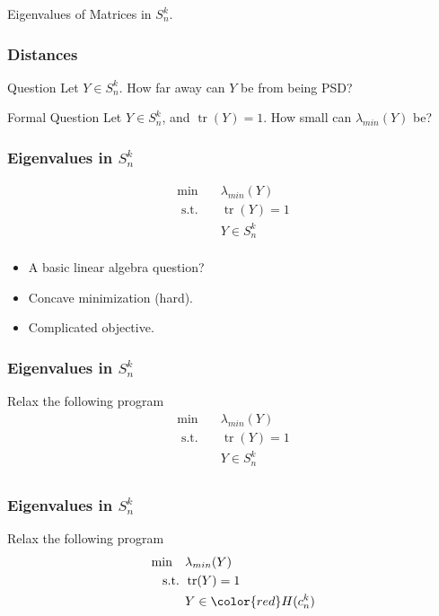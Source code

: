 \documentclass{beamer}
\DeclareMathOperator{\tr}{tr}
\newcommand{\st}{{\text{ s.t. }}}
\begin{document}
\begin{frame}
    \centering
    \huge
    {\color{gray}Eigenvalues of Matrices in $S^k_n$.}
\end{frame}
\begin{frame}
    \frametitle{Distances}
    \begin{block}{Question}
        Let $Y \in S^k_n$. How far away can $Y$ be from being PSD?
    \end{block}
    \pause
    \begin{block}{Formal Question}
        Let $Y \in S^k_n$, and $\tr(Y)=1$. How small can $\lambda_{min}(Y)$ be?
    \end{block}
\end{frame}
\begin{frame}
    \frametitle{Eigenvalues in $S^k_n$}
    \begin{equation*}
        \begin{aligned}
            \min\quad & \lambda_{min}(Y)\\
            \st & \tr(Y) = 1\\
                & Y \in S^k_n\\
        \end{aligned}
    \end{equation*}
    \pause
    \begin{itemize}
        \item A basic linear algebra question?
        \pause
        \item Concave minimization (hard).
        \pause
        \item Complicated objective.
    \end{itemize}
\end{frame}
\begin{frame}
    \frametitle{Eigenvalues in $S^k_n$}
    Relax the following program
    \begin{equation*}
        \begin{aligned}
            \min\quad & \lambda_{min}(Y)\\
            \st & \tr(Y) = 1\\
                & Y \in S^k_n\\
        \end{aligned}
    \end{equation*}
\end{frame}
\begin{frame}
    \frametitle{Eigenvalues in $S^k_n$}
    Relax the following program
    \begin{equation*}
        \begin{aligned}
            \min\quad & \lambda_{min}(Y)\\
            \st & \tr(Y) = 1\\
                & Y \in {\color{red}H(c_n^k)}\\
        \end{aligned}
    \end{equation*}
\end{frame}
\end{document}
